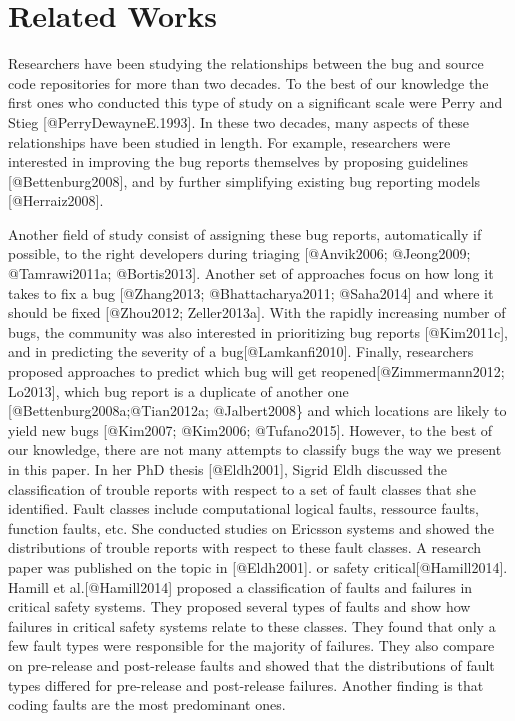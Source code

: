 \section{Related Works}\label{related-works}

Researchers have been studying the relationships between the bug and
source code repositories for more than two decades. To the best of our
knowledge the first ones who conducted this type of study on a
significant scale were Perry and Stieg {[}@PerryDewayneE.1993{]}. In
these two decades, many aspects of these relationships have been studied
in length. For example, researchers were interested in improving the bug
reports themselves by proposing guidelines {[}@Bettenburg2008{]}, and by
further simplifying existing bug reporting models {[}@Herraiz2008{]}.

Another field of study consist of assigning these bug reports,
automatically if possible, to the right developers during triaging
{[}@Anvik2006; @Jeong2009; @Tamrawi2011a; @Bortis2013{]}. Another set of
approaches focus on how long it takes to fix a bug {[}@Zhang2013;
@Bhattacharya2011; @Saha2014{]} and where it should be fixed
{[}@Zhou2012; Zeller2013a{]}. With the rapidly increasing number of
bugs, the community was also interested in prioritizing bug reports
{[}@Kim2011c{]}, and in predicting the severity of a
bug{[}@Lamkanfi2010{]}. Finally, researchers proposed approaches to
predict which bug will get reopened{[}@Zimmermann2012; Lo2013{]}, which
bug report is a duplicate of another one {[}@Bettenburg2008a;@Tian2012a;
@Jalbert2008\} and which locations are likely to yield new bugs
{[}@Kim2007; @Kim2006; @Tufano2015{]}. However, to the best of our
knowledge, there are not many attempts to classify bugs the way we
present in this paper. In her PhD thesis {[}@Eldh2001{]}, Sigrid Eldh
discussed the classification of trouble reports with respect to a set of
fault classes that she identified. Fault classes include computational
logical faults, ressource faults, function faults, etc. She conducted
studies on Ericsson systems and showed the distributions of trouble
reports with respect to these fault classes. A research paper was
published on the topic in {[}@Eldh2001{]}. or safety
critical{[}@Hamill2014{]}. Hamill et al.{[}@Hamill2014{]} proposed a
classification of faults and failures in critical safety systems. They
proposed several types of faults and show how failures in critical
safety systems relate to these classes. They found that only a few fault
types were responsible for the majority of failures. They also compare
on pre-release and post-release faults and showed that the distributions
of fault types differed for pre-release and post-release failures.
Another finding is that coding faults are the most predominant ones.

